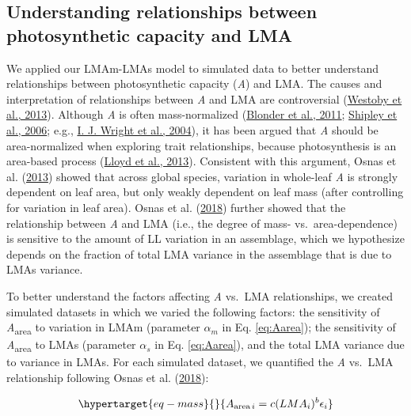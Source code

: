 \documentclass[
  12pt,
  a4paper,
,tablecaptionabove
]{scrartcl}
\begin{document}
\hypertarget{understanding-relationships-between-photosynthetic-capacity-and-lma}{%
\subsection{Understanding relationships between photosynthetic capacity
and
LMA}\label{understanding-relationships-between-photosynthetic-capacity-and-lma}}

We applied our LMAm-LMAs model to simulated data to better understand
relationships between photosynthetic capacity (\emph{A}) and LMA. The
causes and interpretation of relationships between \emph{A} and LMA are
controversial (\protect\hyperlink{ref-Westoby2013}{Westoby et al.,
2013}). Although \emph{A} is often mass-normalized
(\protect\hyperlink{ref-Blonder2011}{Blonder et al., 2011};
\protect\hyperlink{ref-Shipley2006}{Shipley et al., 2006}; e.g.,
\protect\hyperlink{ref-Wright2004a}{I. J. Wright et al., 2004}), it has
been argued that \emph{A} should be area-normalized when exploring trait
relationships, because photosynthesis is an area-based process
(\protect\hyperlink{ref-Lloyd2013}{Lloyd et al., 2013}). Consistent with
this argument, Osnas et al. (\protect\hyperlink{ref-Osnas2013}{2013})
showed that across global species, variation in whole-leaf \emph{A} is
strongly dependent on leaf area, but only weakly dependent on leaf mass
(after controlling for variation in leaf area). Osnas et al.
(\protect\hyperlink{ref-Osnas2018}{2018}) further showed that the
relationship between \emph{A} and LMA (i.e., the degree of mass-
vs.~area-dependence) is sensitive to the amount of LL variation in an
assemblage, which we hypothesize depends on the fraction of total LMA
variance in the assemblage that is due to LMAs variance.

To better understand the factors affecting \emph{A} vs.~LMA
relationships, we created simulated datasets in which we varied the
following factors: the sensitivity of \emph{A}\textsubscript{area} to
variation in LMAm (parameter \(\alpha_m\) in Eq. \ref{eq:Aarea}); the
sensitivity of \emph{A}\textsubscript{area} to LMAs (parameter
\(\alpha_s\) in Eq. \ref{eq:Aarea}), and the total LMA variance due to
variance in LMAs. For each simulated dataset, we quantified the \emph{A}
vs.~LMA relationship following Osnas et al.
(\protect\hyperlink{ref-Osnas2018}{2018}):

\begin{equation}\protect\hypertarget{eq-mass}{}{
A_{\mathrm{area} \, i} = c (LMA_i)^{b}\epsilon_i
}\label{eq-mass}\end{equation}
\end{document}
